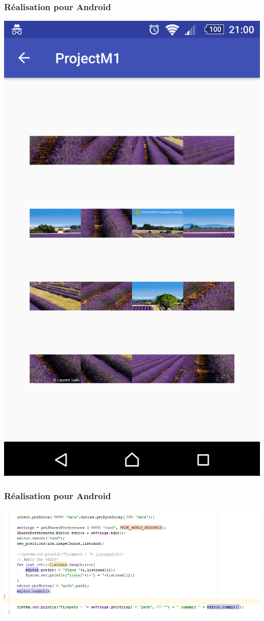 \documentclass{beamer}
\begin{document}
\begin{frame}
\frametitle{Réalisation pour Android}
\begin{center}
  \includegraphics[scale=0.1]{android_menu.png}
\end{center}
\end{frame}

\begin{frame}
\frametitle{Réalisation pour Android}
\begin{center}
  \includegraphics[scale=0.5]{JavaCode1.png}
\end{center}
\end{frame}
\end{document}
